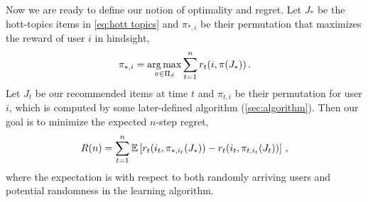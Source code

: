 Now we are ready to define our notion of optimality and regret. Let $J_\ast$ be the hott-topics items in \eqref{eq:hott topics} and $\pi_{\ast, i}$ be their permutation that maximizes the reward of user $i$ in hindsight,
\begin{align*}
  \pi_{\ast, i} =
  \mathop{\rm arg\,max}_{\pi \in \Pi_d} \sum_{t = 1}^n r_t(i, \pi(J_\ast))\,.
\end{align*}
Let $J_t$ be our recommended items at time $t$ and $\pi_{t, i}$ be their permutation for user $i$, which is computed by some later-defined algorithm (\cref{sec:algorithm}). Then our goal is to minimize the expected $n$-step regret,
\begin{align}
  R(n) =
  \sum_{t = 1}^n \mathbb{E}\left[r_t(i_t, \pi_{\ast, i_t}(J_\ast)) - r_t(i_t, \pi_{t, i_t}(J_t))\right]\,,
  \label{eq:regret}
\end{align}
where the expectation is with respect to both randomly arriving users and potential randomness in the learning algorithm.

